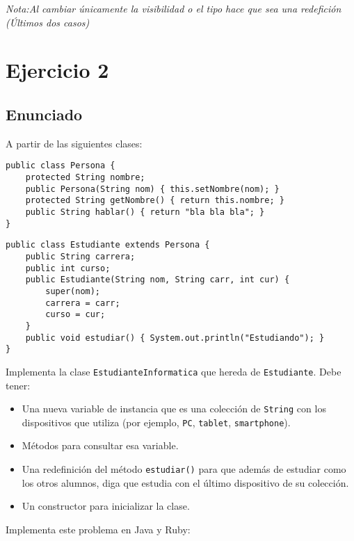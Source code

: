 \documentclass[a4paper,12pt]{article}
\begin{document}
\textit{Nota:Al cambiar únicamente la visibilidad o el tipo hace que sea una redefición (Últimos dos casos)}
    

\section{Ejercicio 2}
\subsection{Enunciado}




A partir de las siguientes clases:

\begin{lstlisting}[style=customjava]
public class Persona {
    protected String nombre;
    public Persona(String nom) { this.setNombre(nom); }
    protected String getNombre() { return this.nombre; }
    public String hablar() { return "bla bla bla"; }
}
\end{lstlisting}

\begin{lstlisting}[style=customjava]
public class Estudiante extends Persona {
    public String carrera;
    public int curso;
    public Estudiante(String nom, String carr, int cur) {
        super(nom);
        carrera = carr;
        curso = cur;
    }
    public void estudiar() { System.out.println("Estudiando"); }
}
\end{lstlisting}

Implementa la clase \texttt{EstudianteInformatica} que hereda de \texttt{Estudiante}. Debe tener:

\begin{itemize}
    \item Una nueva variable de instancia que es una colección de \texttt{String} con los dispositivos que utiliza (por ejemplo, \texttt{PC}, \texttt{tablet}, \texttt{smartphone}).
    \item Métodos para consultar esa variable.
    \item Una redefinición del método \texttt{estudiar()} para que además de estudiar como los otros alumnos, diga que estudia con el último dispositivo de su colección.
    \item Un constructor para inicializar la clase.
\end{itemize}

Implementa este problema en Java y Ruby:


\end{document}
